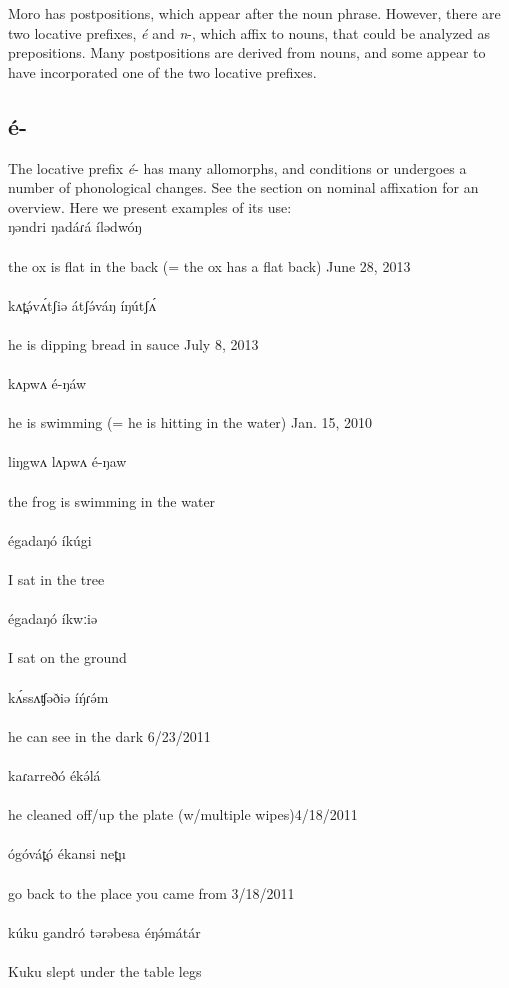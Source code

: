 
Moro has postpositions, which appear after the noun phrase. However, there are two locative prefixes, \textit{é} and \textit{n}-, which affix to nouns, that could be analyzed as prepositions. Many postpositions are derived from nouns, and some appear to have incorporated one of the two locative prefixes.

\subsection{é-}
The locative prefix \textit{é}- has many allomorphs, and conditions or undergoes a number of phonological changes. See the section on nominal affixation for an overview. Here we present examples of its use:
\\
\gll ŋəndri ŋadáɾá ílədwóŋ\\
\\
\trans the ox is flat in the back (= the ox has a flat back)	\hfill June 28, 2013\\
\\
\gll kʌt̪ə́vʌ́tʃiə átʃə́váŋ íŋútʃʌ́\\
\\
\trans he is dipping bread in sauce	\hfill July 8, 2013\\
\\
\gll kʌpwʌ  é-ŋáw\\
\\
\trans he is swimming (= he is hitting in the water)	 \hfill	Jan. 15, 2010\\
\\
\gll liŋgwʌ lʌpwʌ é-ŋaw\\
\\
\trans the frog is swimming in the water\\
\\
\gll égadaŋó íkúgi\\
\\
\trans I sat in the tree\\
\\
\gll égadaŋó íkwːiə\\
\\
\trans I sat on the ground\\
\\
\gll kʌ́ssʌʧəðiə íŋ́ɾə́m\\
\\
\trans he can see in the dark	\hfill	6/23/2011\\
\\
\gll kaɾarreðó ékə́lá\\
\\
\trans he cleaned off/up the plate (w/multiple wipes)\hfill	4/18/2011\\
\\
\gll ógóvát̪ó ékansi net̪u\\
\\
\trans go back to the place you came from \hfill	3/18/2011\\
\\
\gll kúku gandró tərəbesa éŋə́mátár\\
\\
\trans Kuku slept under the table legs\\
\\
